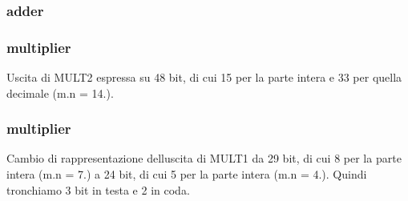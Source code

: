 \subsubsection[{\texorpdfstring{add2}{add2}}]{ {\bfseries \textcolor{vhdlchar}{adder}\textcolor{vhdlchar}{ }} \hspace{0.3cm}{\ttfamily [Instantiation]}}\hypertarget{class_linear_regression_1_1_structural_a09e3b860880a85f376374594ffd092fb}{}\label{class_linear_regression_1_1_structural_a09e3b860880a85f376374594ffd092fb}
\subsubsection[{\texorpdfstring{mult1}{mult1}}]{ {\bfseries \textcolor{vhdlchar}{multiplier}\textcolor{vhdlchar}{ }} \hspace{0.3cm}{\ttfamily [Instantiation]}}\hypertarget{class_linear_regression_1_1_structural_abe2dbada52541335e367815bffe06c28}{}\label{class_linear_regression_1_1_structural_abe2dbada52541335e367815bffe06c28}
Uscita di M\+U\+L\+T2 espressa su 48 bit, di cui 15 per la parte intera e 33 per quella decimale (m.\+n = 14.). 
\subsubsection[{\texorpdfstring{mult2}{mult2}}]{ {\bfseries \textcolor{vhdlchar}{multiplier}\textcolor{vhdlchar}{ }} \hspace{0.3cm}{\ttfamily [Instantiation]}}\hypertarget{class_linear_regression_1_1_structural_a7c5c7b6fb03b66e49b0eb767162f01a8}{}\label{class_linear_regression_1_1_structural_a7c5c7b6fb03b66e49b0eb767162f01a8}
Cambio di rappresentazione dell\textquotesingle{}uscita di M\+U\+L\+T1 da 29 bit, di cui 8 per la parte intera (m.\+n = 7.) a 24 bit, di cui 5 per la parte intera (m.\+n = 4.). Quindi tronchiamo 3 bit in testa e 2 in coda. 

